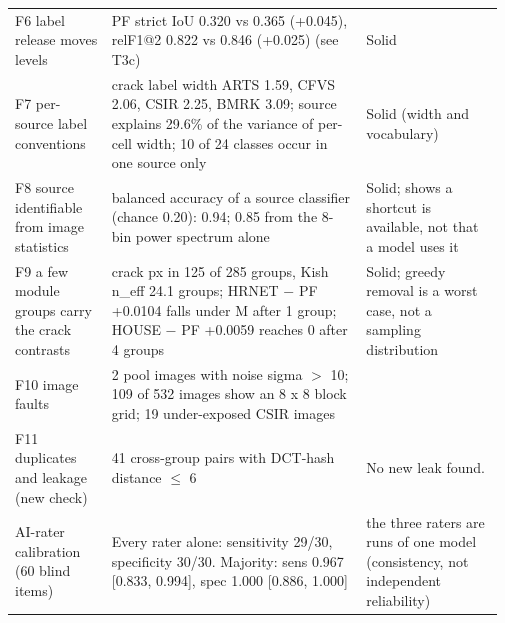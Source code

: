\begin{table}[htbp]
\begin{tabular}{@{}>{\raggedright\arraybackslash\hspace{0pt}}p{0.193\linewidth}>{\raggedright\arraybackslash\hspace{0pt}}p{0.503\linewidth}>{\raggedright\arraybackslash\hspace{0pt}}p{0.271\linewidth}@{}}
F6 label release moves levels & PF strict IoU 0.320 vs 0.365 (+0.045), relF1@2 0.822 vs 0.846 (+0.025) (see T3c) & Solid \\
F7 per-source label conventions & crack label width ARTS 1.59, CFVS 2.06, CSIR 2.25, BMRK 3.09; source explains 29.6\% of the variance of per-cell width; 10 of 24 classes occur in one source only & Solid (width and vocabulary) \\
F8 source identifiable from image statistics & balanced accuracy of a source classifier (chance 0.20): 0.94; 0.85 from the 8-bin power spectrum alone & Solid; shows a shortcut is available, not that a model uses it \\
F9 a few module groups carry the crack contrasts & crack px in 125 of 285 groups, Kish n\_\allowbreak{}eff 24.1 groups; HRNET $-$ PF +0.0104 falls under M after 1 group; HOUSE $-$ PF +0.0059 reaches 0 after 4 groups & Solid; greedy removal is a worst case, not a sampling distribution \\
F10 image faults & 2 pool images with noise sigma $>$ 10; 109 of 532 images show an 8 x 8 block grid; 19 under-exposed CSIR images &  \\
F11 duplicates and leakage (new check) & 41 cross-group pairs with DCT-hash distance $\leq$ 6 & No new leak found. \\
AI-rater calibration (60 blind items) & Every rater alone: sensitivity 29/\allowbreak{}30, specificity 30/\allowbreak{}30. Majority: sens 0.967 [0.833, 0.994], spec 1.000 [0.886, 1.000] & the three raters are runs of one model (consistency, not independent reliability) \\
\bottomrule
\end{tabular}
\end{table}

